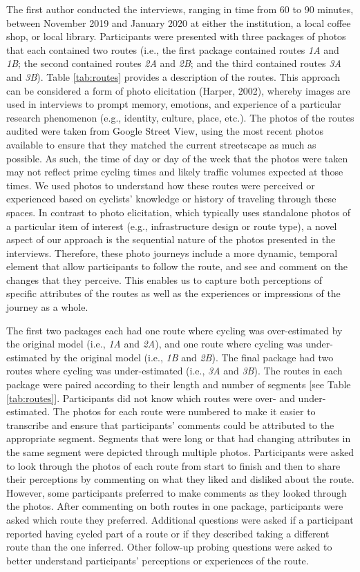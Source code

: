 \documentclass[]{elsarticle} %
\begin{document}
The first author conducted the interviews, ranging in time from 60 to 90
minutes, between November 2019 and January 2020 at either the
institution, a local coffee shop, or local library. Participants were
presented with three packages of photos that each contained two routes
(i.e., the first package contained routes \emph{1A} and \emph{1B}; the
second contained routes \emph{2A} and \emph{2B}; and the third contained
routes \emph{3A} and \emph{3B}). Table \ref{tab:routes} provides a
description of the routes. This approach can be considered a form of
photo elicitation (Harper, 2002), whereby images are used in interviews
to prompt memory, emotions, and experience of a particular research
phenomenon (e.g., identity, culture, place, etc.). The photos of the
routes audited were taken from Google Street View, using the most recent
photos available to ensure that they matched the current streetscape as
much as possible. As such, the time of day or day of the week that the
photos were taken may not reflect prime cycling times and likely traffic
volumes expected at those times. We used photos to understand how these
routes were perceived or experienced based on cyclists' knowledge or
history of traveling through these spaces. In contrast to photo
elicitation, which typically uses standalone photos of a particular item
of interest (e.g., infrastructure design or route type), a novel aspect
of our approach is the sequential nature of the photos presented in the
interviews. Therefore, these photo journeys include a more dynamic,
temporal element that allow participants to follow the route, and see
and comment on the changes that they perceive. This enables us to
capture both perceptions of specific attributes of the routes as well as
the experiences or impressions of the journey as a whole.

The first two packages each had one route where cycling was
over-estimated by the original model (i.e., \emph{1A} and \emph{2A}),
and one route where cycling was under-estimated by the original model
(i.e., \emph{1B} and \emph{2B}). The final package had two routes where
cycling was under-estimated (i.e., \emph{3A} and \emph{3B}). The routes
in each package were paired according to their length and number of
segments {[}see Table \ref{tab:routes}{]}. Participants did not know
which routes were over- and under-estimated. The photos for each route
were numbered to make it easier to transcribe and ensure that
participants' comments could be attributed to the appropriate segment.
Segments that were long or that had changing attributes in the same
segment were depicted through multiple photos. Participants were asked
to look through the photos of each route from start to finish and then
to share their perceptions by commenting on what they liked and disliked
about the route. However, some participants preferred to make comments
as they looked through the photos. After commenting on both routes in
one package, participants were asked which route they preferred.
Additional questions were asked if a participant reported having cycled
part of a route or if they described taking a different route than the
one inferred. Other follow-up probing questions were asked to better
understand participants' perceptions or experiences of the route.
\end{document}
